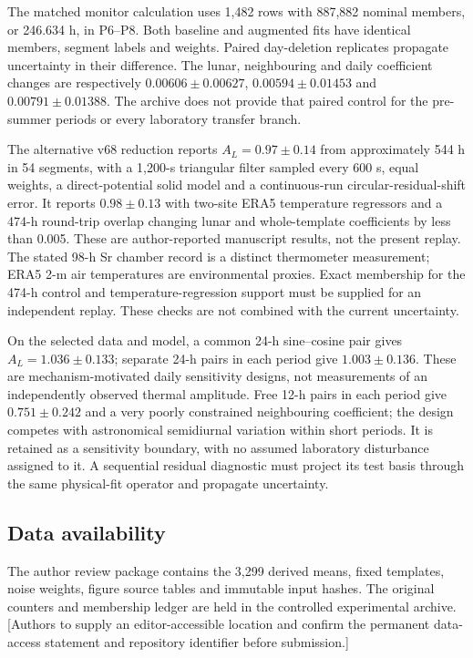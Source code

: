 \documentclass[
  10pt,
  a4paper,
]{article}
\begin{document}
The matched monitor calculation uses 1,482 rows with 887,882 nominal
members, or 246.634 h, in P6--P8. Both baseline and augmented fits have
identical members, segment labels and weights. Paired day-deletion
replicates propagate uncertainty in their difference. The lunar,
neighbouring and daily coefficient changes are respectively
\(0.00606\pm0.00627\), \(0.00594\pm0.01453\) and \(0.00791\pm0.01388\).
The archive does not provide that paired control for the pre-summer
periods or every laboratory transfer branch.

The alternative v68 reduction reports \(A_L=0.97\pm0.14\) from
approximately 544 h in 54 segments, with a 1,200-s triangular filter
sampled every 600 s, equal weights, a direct-potential solid model and a
continuous-run circular-residual-shift error. It reports \(0.98\pm0.13\)
with two-site ERA5 temperature regressors and a 474-h round-trip overlap
changing lunar and whole-template coefficients by less than 0.005. These
are author-reported manuscript results, not the present replay. The
stated 98-h Sr chamber record is a distinct thermometer measurement;
ERA5 2-m air temperatures are environmental proxies. Exact membership
for the 474-h control and temperature-regression support must be
supplied for an independent replay. These checks are not combined with
the current uncertainty.

On the selected data and model, a common 24-h sine--cosine pair gives
\(A_L=1.036\pm0.133\); separate 24-h pairs in each period give
\(1.003\pm0.136\). These are mechanism-motivated daily sensitivity
designs, not measurements of an independently observed thermal
amplitude. Free 12-h pairs in each period give \(0.751\pm0.242\) and a
very poorly constrained neighbouring coefficient; the design competes
with astronomical semidiurnal variation within short periods. It is
retained as a sensitivity boundary, with no assumed laboratory
disturbance assigned to it. A sequential residual diagnostic must
project its test basis through the same physical-fit operator and
propagate uncertainty.

\singlespacing

\hypertarget{data-availability}{%
\subsection{Data availability}\label{data-availability}}

The author review package contains the 3,299 derived means, fixed
templates, noise weights, figure source tables and immutable input
hashes. The original counters and membership ledger are held in the
controlled experimental archive. {[}Authors to supply an
editor-accessible location and confirm the permanent data-access
statement and repository identifier before submission.{]}
\end{document}
